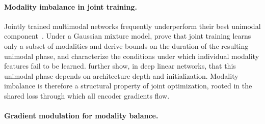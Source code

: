 \documentclass{article}
\begin{document}
\paragraph{Modality imbalance in joint training.}

Jointly trained multimodal networks frequently underperform their best unimodal component~\citep{wang2020gblending}. Under a Gaussian mixture model, \citet{huang2022modality} prove that joint training learns only a subset of modalities and derive bounds on the duration of the resulting unimodal phase, and \citet{du2023suppression} characterize the conditions under which individual modality features fail to be learned. \citet{zhang2024unimodal} further show, in deep linear networks, that this unimodal phase depends on architecture depth and initialization. Modality imbalance is therefore a structural property of joint optimization, rooted in the shared loss through which all encoder gradients flow.


\paragraph{Gradient modulation for modality balance.}
\end{document}
